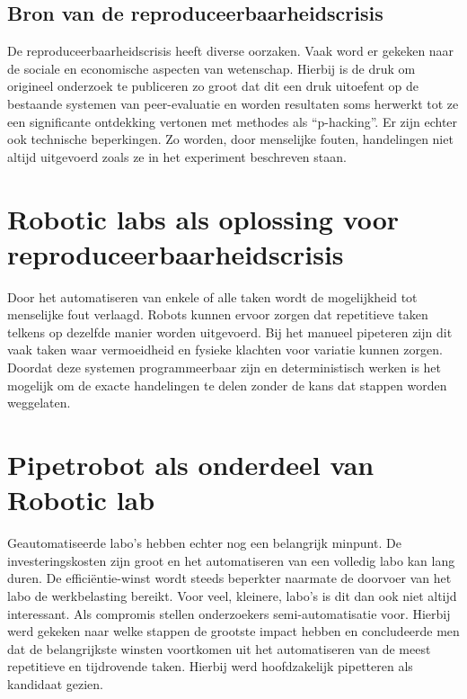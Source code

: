 \subsection{Bron van de reproduceerbaarheidscrisis}
De reproduceerbaarheidscrisis heeft diverse oorzaken. Vaak word er gekeken naar de sociale en economische aspecten van wetenschap.\cite{RN12} Hierbij is de druk om origineel onderzoek te publiceren zo groot dat dit een druk uitoefent op de bestaande systemen van peer-evaluatie en worden resultaten soms herwerkt tot ze een significante ontdekking vertonen met methodes als “p-hacking”.\cite{RN2,RN6} Er zijn echter ook technische beperkingen. Zo worden, door menselijke fouten, handelingen niet altijd uitgevoerd zoals ze in het experiment beschreven staan. 

\section{Robotic labs als oplossing voor reproduceerbaarheidscrisis}
Door het automatiseren van enkele of alle taken wordt de mogelijkheid tot menselijke fout verlaagd. Robots kunnen ervoor zorgen dat repetitieve taken telkens op dezelfde manier worden uitgevoerd. Bij het manueel pipeteren zijn dit vaak taken waar vermoeidheid en fysieke klachten voor variatie kunnen zorgen.\ \cite{RN9} Doordat deze systemen programmeerbaar zijn en deterministisch werken is het mogelijk om de exacte handelingen te delen zonder de kans dat stappen worden weggelaten.
\section{Pipetrobot als onderdeel van Robotic lab}
Geautomatiseerde labo’s hebben echter nog een belangrijk minpunt. De investeringskosten zijn groot en het automatiseren van een volledig labo kan lang duren. De efficiëntie-winst wordt steeds beperkter naarmate de doorvoer van het labo de werkbelasting bereikt. Voor veel, kleinere, labo’s is dit dan ook niet altijd interessant. Als compromis stellen onderzoekers semi-automatisatie voor. Hierbij werd gekeken naar welke stappen de grootste impact hebben en concludeerde men dat de belangrijkste winsten voortkomen uit het automatiseren van de meest repetitieve en tijdrovende taken. Hierbij werd hoofdzakelijk pipetteren als kandidaat gezien.\cite{RN11,RN7}
